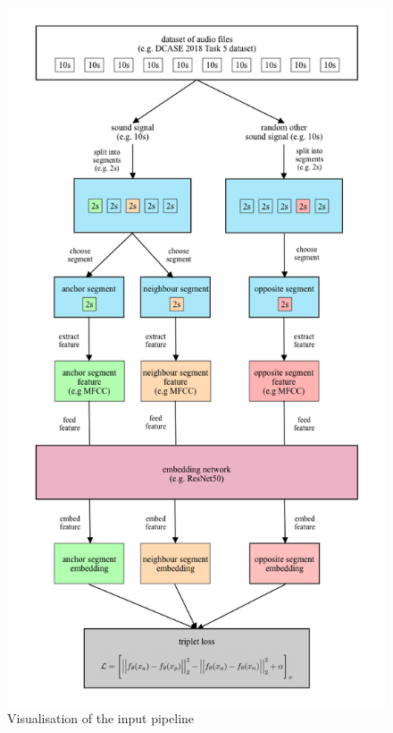 \begin{figure}[htbp]
	\centering
	\includegraphics[scale=0.4]{baa-documentation/img/Input_Pipeline_Visualisation.png}
	\caption{Visualisation of the input pipeline}
	\label{fig:Input-Pipeline-Visualisation}
\end{figure}

